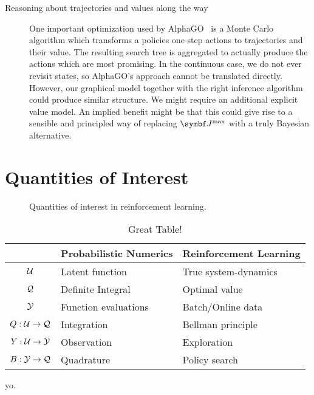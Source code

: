 \begin{description}
    \item[Reasoning about trajectories and values along the way]
        One important optimization used by AlphaGO~\parencite{silver_mastering_2017} is a Monte Carlo algorithm which transforms a policies one-step actions to trajectories and their value.
        The resulting search tree is aggregated to actually produce the actions which are most promising.
        In the continuous case, we do not ever revisit states, so AlphaGO's approach cannot be translated directly.
        However, our graphical model together with the right inference algorithm could produce similar structure.
        We might require an additional explicit value model.
        An implied benefit might be that this could give rise to a sensible and principled way of replacing $\mat{J}^{\text{max}}$ with a truly Bayesian alternative.
\end{description}


\section{Quantities of Interest}
\label{sec:quantities_of_interest}
\begin{figure}[t]
    \centering
    
    \caption[Quantities of interest in reinforcement learning]{
        Quantities of interest in reinforcement learning.
    }
    \label{fig:agent_environment_interaction}
\end{figure}
\begin{table}[t]
    \centering
    \caption{Great Table!}
    \label{tab:label}
    \begin{tabularx}{\textwidth}{cYY}
        \toprule
        & Probabilistic Numerics & Reinforcement Learning \\
        \midrule
        $\mathcal{U}$ & Latent function & True system-dynamics \\
        $\mathcal{Q}$ & Definite Integral & Optimal value \\
        $\mathcal{Y}$ & Function evaluations & Batch/Online data \\
        \midrule
        $Q : \mathcal{U} \to \mathcal{Q}$ & Integration & Bellman principle \\
        $Y : \mathcal{U} \to \mathcal{Y}$ & Observation & Exploration \\
        $B : \mathcal{Y} \to \mathcal{Q}$ & Quadrature & Policy search \\
        \bottomrule
    \end{tabularx}
\end{table}
yo.


\nocite{*}
\printbibliography

